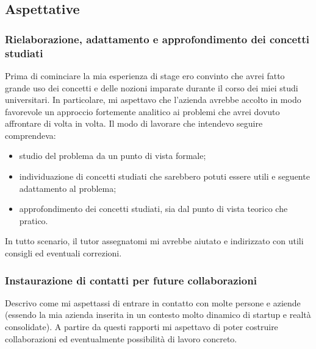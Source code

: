 		\subsection{Aspettative}
			\subsubsection{Rielaborazione, adattamento e approfondimento dei concetti studiati}
				Prima di cominciare la mia esperienza di stage ero convinto che avrei fatto grande uso dei concetti e delle nozioni
				imparate durante il corso dei miei studi universitari. In particolare, mi aspettavo che l'azienda avrebbe accolto
				in modo favorevole un approccio fortemente analitico ai problemi che avrei dovuto affrontare di volta in volta. Il
				modo di lavorare che intendevo seguire comprendeva:
				\begin{itemize}
					\item studio del problema da un punto di vista formale;
					\item individuazione di concetti studiati che sarebbero potuti essere utili e seguente adattamento al
					problema;
					\item approfondimento dei concetti studiati, sia dal punto di vista teorico che pratico.
				\end{itemize}
				In tutto scenario, il tutor assegnatomi mi avrebbe aiutato e indirizzato con utili consigli ed eventuali correzioni.
			\subsubsection{Instaurazione di contatti per future collaborazioni}
				Descrivo come mi aspettassi di entrare in contatto con molte persone e aziende (essendo la mia azienda inserita in
				un contesto molto dinamico di startup e realtà consolidate). A partire da questi rapporti mi aspettavo di poter
				costruire collaborazioni ed eventualmente possibilità di lavoro concreto.
